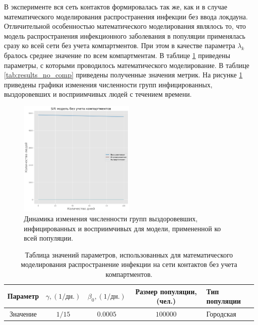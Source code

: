\documentclass[14pt,a4paper]{article}
\begin{document}
В эксперименте вся сеть контактов формировалась так же, как и в случае математического моделирования распространения инфекции без ввода локдауна. Отличительной особенностью математического моделирования являлось то, что модель распространения инфекционного заболевания в популяции применялась сразу ко всей сети без учета компартментов. При этом в качестве параметра $\lambda_k$ бралось среднее значение по всем компартментам.
В таблице \ref{tab:table_paremeters_no_comp} приведены параметры, с которыми проводилось математического моделирование. В таблице \ref{tab:results_no_comp} приведены полученные значения  метрик. На рисунке \ref{fig:small_world_graphics_no_comp} приведены графики изменения численности групп инфицированных, выздоровевших и восприимчивых людей с течением времени.


\begin{figure}[h!]
		\centering
\includegraphics[width=0.5\textwidth]{img/sir_to_all.png}
\caption{Динамика изменения численности групп выздоровевших, инфицированных и восприимчивых для модели, примененной ко всей популяции.}
\label{fig:small_world_graphics_no_comp}
\end{figure}



\begin{table}[h!]
	\centering
		\caption{Таблица значений параметров, использованных для математического моделирования распространение инфекции на сети контактов без учета компартментов.}
	\begin{tabularx}{\textwidth}{|c|c|c|c|X|}
		\hline
		Параметр & $\gamma,  (1/\text{дн.})$ & $\beta_0, (1/\text{дн.})$ & Размер популяции, (чел.)& Тип популяции \\
		\hline
		Значение & $1/15$ & $0.0005$ & $100000$ & Городская \\
		\hline
	\end{tabularx}
	\label{tab:table_paremeters_no_comp}
\end{table}
\end{document}
